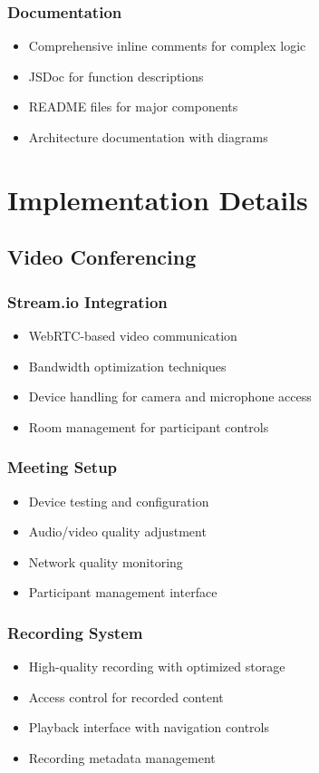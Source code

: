 \documentclass[12pt,a4paper]{report}
\begin{document}
\subsubsection{Documentation}
\begin{itemize}
   \item Comprehensive inline comments for complex logic
   \item JSDoc for function descriptions
   \item README files for major components
   \item Architecture documentation with diagrams
\end{itemize}

\section{Implementation Details}

\subsection{Video Conferencing}
\subsubsection{Stream.io Integration}
\begin{itemize}
   \item WebRTC-based video communication
   \item Bandwidth optimization techniques
   \item Device handling for camera and microphone access
   \item Room management for participant controls
\end{itemize}

\subsubsection{Meeting Setup}
\begin{itemize}
   \item Device testing and configuration
   \item Audio/video quality adjustment
   \item Network quality monitoring
   \item Participant management interface
\end{itemize}

\subsubsection{Recording System}
\begin{itemize}
   \item High-quality recording with optimized storage
   \item Access control for recorded content
   \item Playback interface with navigation controls
   \item Recording metadata management
\end{itemize}
\end{document}
